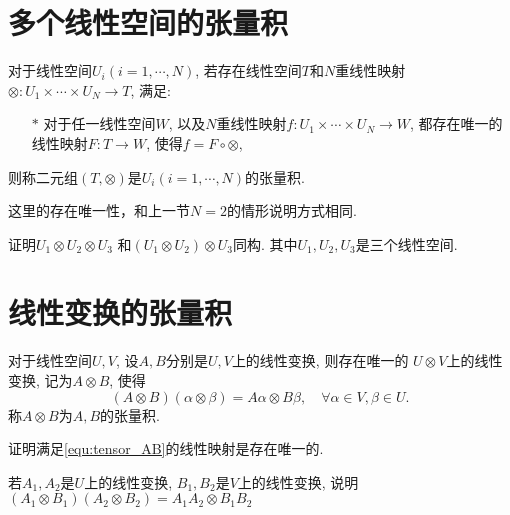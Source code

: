 \section{多个线性空间的张量积}
\begin{definition}
    对于线性空间$U_i(i=1,\cdots, N)$, 
    若存在线性空间$T$和$N$重线性映射$\otimes: U_1\times \cdots \times U_N
     \rightarrow T$,
    满足: 
    \begin{enumerate}
        \item[$*$] 对于任一线性空间$W$, 以及$N$重线性映射$f: U_1\times \cdots \times U_N
        \rightarrow W$, 都存在唯一的线性映射$F: T\rightarrow W$, 使得$f = F \circ \otimes$,
    \end{enumerate}
    则称二元组$(T, \otimes)$是$U_i(i=1,\cdots, N)$的张量积.
\end{definition}
\begin{remark}
    这里的存在唯一性，和上一节$N=2$的情形说明方式相同.
\end{remark}

\begin{remark}
    证明$U_1 \otimes U_2 \otimes U_3$ 和$(U_1 \otimes U_2) \otimes U_3$同构.
    其中$U_1, U_2, U_3$是三个线性空间.
\end{remark}
\vspace{6cm}


\section{线性变换的张量积}
\begin{definition}
    对于线性空间$U,V$, 设$A,B$分别是$U,V$上的线性变换, 则存在唯一的
    $U\otimes V$上的线性变换, 记为$A\otimes B$, 使得
    \begin{equation}
    (A\otimes B)(\alpha \otimes \beta) = A\alpha \otimes B\beta, 
    \quad \forall \alpha \in V, \beta \in U.
    \label{equ:tensor_AB}
    \end{equation}
    称$A\otimes B$为$A,B$的张量积.
\end{definition}
\begin{remark}
    证明满足\eqref{equ:tensor_AB}的线性映射是存在唯一的.
\end{remark}
\vspace{3cm}

\begin{remark}
    若$A_1, A_2$是$U$上的线性变换, $B_1, B_2$是$V$上的线性变换,
    说明$(A_1 \otimes B_1)(A_2 \otimes B_2) = A_1A_2 \otimes B_1 B_2$
\end{remark}
\vspace{3cm}

